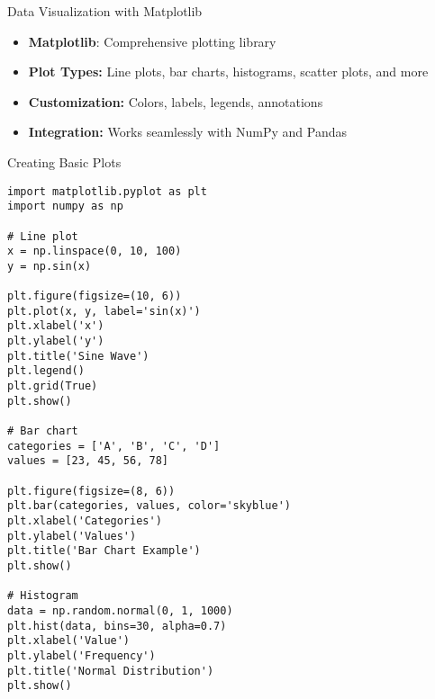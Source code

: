 \begin{frame}{Data Visualization with Matplotlib}
    \begin{itemize}
        \item \textbf{Matplotlib}: Comprehensive plotting library
        \item \textbf{Plot Types:} Line plots, bar charts, histograms, scatter plots, and more
        \item \textbf{Customization:} Colors, labels, legends, annotations
        \item \textbf{Integration:} Works seamlessly with NumPy and Pandas
    \end{itemize}
\end{frame}

\begin{frame}[fragile]{Creating Basic Plots}
    \begin{codeblock}
        \begin{lstlisting}
import matplotlib.pyplot as plt
import numpy as np

# Line plot
x = np.linspace(0, 10, 100)
y = np.sin(x)

plt.figure(figsize=(10, 6))
plt.plot(x, y, label='sin(x)')
plt.xlabel('x')
plt.ylabel('y')
plt.title('Sine Wave')
plt.legend()
plt.grid(True)
plt.show()

# Bar chart
categories = ['A', 'B', 'C', 'D']
values = [23, 45, 56, 78]

plt.figure(figsize=(8, 6))
plt.bar(categories, values, color='skyblue')
plt.xlabel('Categories')
plt.ylabel('Values')
plt.title('Bar Chart Example')
plt.show()

# Histogram
data = np.random.normal(0, 1, 1000)
plt.hist(data, bins=30, alpha=0.7)
plt.xlabel('Value')
plt.ylabel('Frequency')
plt.title('Normal Distribution')
plt.show()
        \end{lstlisting}
    \end{codeblock}
\end{frame}
